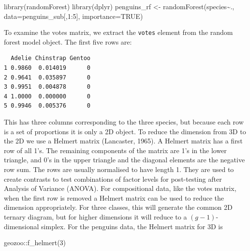 \documentclass[
  letterpaper,
]{krantz}
\newenvironment{Shaded}{\begin{snugshade}}{\end{snugshade}}
\newcommand{\AttributeTok}[1]{\textcolor[rgb]{0.40,0.45,0.13}{#1}}
\newcommand{\ConstantTok}[1]{\textcolor[rgb]{0.56,0.35,0.01}{#1}}
\newcommand{\DecValTok}[1]{\textcolor[rgb]{0.68,0.00,0.00}{#1}}
\newcommand{\FunctionTok}[1]{\textcolor[rgb]{0.28,0.35,0.67}{#1}}
\newcommand{\NormalTok}[1]{\textcolor[rgb]{0.00,0.23,0.31}{#1}}
\newcommand{\OtherTok}[1]{\textcolor[rgb]{0.00,0.23,0.31}{#1}}
\newcommand{\SpecialCharTok}[1]{\textcolor[rgb]{0.37,0.37,0.37}{#1}}
\begin{document}
\begin{Shaded}
\begin{Highlighting}[]
\FunctionTok{library}\NormalTok{(randomForest)}
\FunctionTok{library}\NormalTok{(dplyr)}
\NormalTok{penguins\_rf }\OtherTok{\textless{}{-}} \FunctionTok{randomForest}\NormalTok{(species}\SpecialCharTok{\textasciitilde{}}\NormalTok{.,}
                             \AttributeTok{data=}\NormalTok{penguins\_sub[,}\DecValTok{1}\SpecialCharTok{:}\DecValTok{5}\NormalTok{],}
                             \AttributeTok{importance=}\ConstantTok{TRUE}\NormalTok{)}
\end{Highlighting}
\end{Shaded}

To examine the votes matrix, we extract the \texttt{votes} element from
the random forest model object. The first five rows are:

\begin{Shaded}
\end{Shaded}

\begin{verbatim}
  Adelie Chinstrap Gentoo
1 0.9860  0.014019      0
2 0.9641  0.035897      0
3 0.9951  0.004878      0
4 1.0000  0.000000      0
5 0.9946  0.005376      0
\end{verbatim}

This has three columns corresponding to the three species, but because
each row is a set of proportions it is only a 2D object. To reduce the
dimension from 3D to the 2D we use a Helmert matrix (Lancaster, 1965). A
Helmert matrix has a first row of all 1's. The remaining components of
the matrix are 1's in the lower triangle, and 0's in the upper triangle
and the diagonal elements are the negative row sum. The rows are usually
normalised to have length 1. They are used to create contrasts to test
combinations of factor levels for post-testing after Analysis of
Variance (ANOVA). For compositional data, like the votes matrix, when
the first row is removed a Helmert matrix can be used to reduce the
dimension appropriately. For three classes, this will generate the
common 2D ternary diagram, but for higher dimensions it will reduce to a
\((g-1)\)-dimensional simplex. For the penguins data, the Helmert matrix
for 3D is 

\begin{Shaded}
\begin{Highlighting}[]
\NormalTok{geozoo}\SpecialCharTok{::}\FunctionTok{f\_helmert}\NormalTok{(}\DecValTok{3}\NormalTok{)}
\end{Highlighting}
\end{Shaded}
\end{document}
